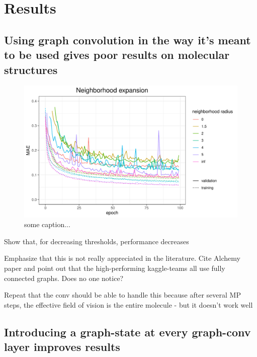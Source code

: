 \chapter{Results}
\label{chapter:Results}



\section{Using graph convolution in the way it's meant to be used gives poor results on molecular structures}


\begin{figure}[H]
	\includegraphics[width=\linewidth]{figures/tencent-mpnn-neighborhood-expansion}
	
	\caption{some caption...}
	\label{fig:distance_threshold}
\end{figure}

{\itshape

Show that, for decreasing thresholds, performance decreases

Emphasize that this is not really appreciated in the literature.
Cite Alchemy paper and point out that the high-performing kaggle-teams all use fully connected graphs.
Does no one notice?

Repeat that the conv should be able to handle this because after several MP steps, the effective field of vision is the entire molecule - but it doesn't work well
}

\section{Introducing a graph-state at every graph-conv layer improves results}



